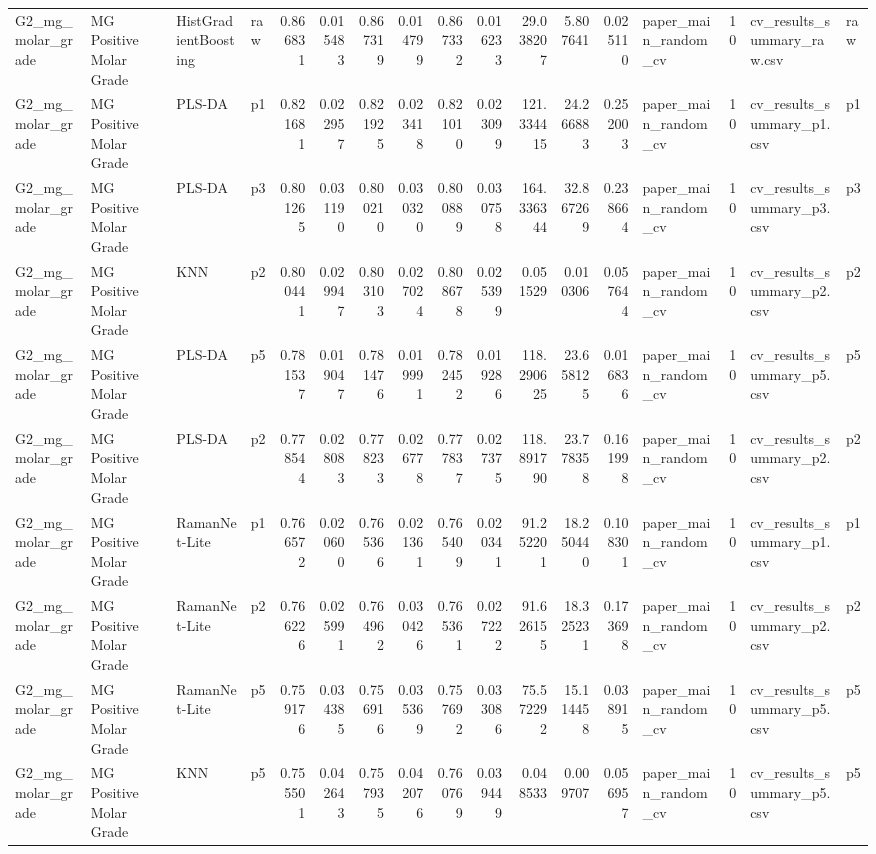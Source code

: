 \begin{tabular}{llllrrrrrrrrrlrll}
G2_mg_molar_grade & MG Positive Molar Grade & HistGradientBoosting & raw & 0.866831 & 0.015483 & 0.867319 & 0.014799 & 0.867332 & 0.016233 & 29.038207 & 5.807641 & 0.025110 & paper_main_random_cv & 10 & cv_results_summary_raw.csv & raw \\
G2_mg_molar_grade & MG Positive Molar Grade & PLS-DA & p1 & 0.821681 & 0.022957 & 0.821925 & 0.023418 & 0.821010 & 0.023099 & 121.334415 & 24.266883 & 0.252003 & paper_main_random_cv & 10 & cv_results_summary_p1.csv & p1 \\
G2_mg_molar_grade & MG Positive Molar Grade & PLS-DA & p3 & 0.801265 & 0.031190 & 0.800210 & 0.030320 & 0.800889 & 0.030758 & 164.336344 & 32.867269 & 0.238664 & paper_main_random_cv & 10 & cv_results_summary_p3.csv & p3 \\
G2_mg_molar_grade & MG Positive Molar Grade & KNN & p2 & 0.800441 & 0.029947 & 0.803103 & 0.027024 & 0.808678 & 0.025399 & 0.051529 & 0.010306 & 0.057644 & paper_main_random_cv & 10 & cv_results_summary_p2.csv & p2 \\
G2_mg_molar_grade & MG Positive Molar Grade & PLS-DA & p5 & 0.781537 & 0.019047 & 0.781476 & 0.019991 & 0.782452 & 0.019286 & 118.290625 & 23.658125 & 0.016836 & paper_main_random_cv & 10 & cv_results_summary_p5.csv & p5 \\
G2_mg_molar_grade & MG Positive Molar Grade & PLS-DA & p2 & 0.778544 & 0.028083 & 0.778233 & 0.026778 & 0.777837 & 0.027375 & 118.891790 & 23.778358 & 0.161998 & paper_main_random_cv & 10 & cv_results_summary_p2.csv & p2 \\
G2_mg_molar_grade & MG Positive Molar Grade & RamanNet-Lite & p1 & 0.766572 & 0.020600 & 0.765366 & 0.021361 & 0.765409 & 0.020341 & 91.252201 & 18.250440 & 0.108301 & paper_main_random_cv & 10 & cv_results_summary_p1.csv & p1 \\
G2_mg_molar_grade & MG Positive Molar Grade & RamanNet-Lite & p2 & 0.766226 & 0.025991 & 0.764962 & 0.030426 & 0.765361 & 0.027222 & 91.626155 & 18.325231 & 0.173698 & paper_main_random_cv & 10 & cv_results_summary_p2.csv & p2 \\
G2_mg_molar_grade & MG Positive Molar Grade & RamanNet-Lite & p5 & 0.759176 & 0.034385 & 0.756916 & 0.035369 & 0.757692 & 0.033086 & 75.572292 & 15.114458 & 0.038915 & paper_main_random_cv & 10 & cv_results_summary_p5.csv & p5 \\
G2_mg_molar_grade & MG Positive Molar Grade & KNN & p5 & 0.755501 & 0.042643 & 0.757935 & 0.042076 & 0.760769 & 0.039449 & 0.048533 & 0.009707 & 0.056957 & paper_main_random_cv & 10 & cv_results_summary_p5.csv & p5 \\

\end{tabular}

